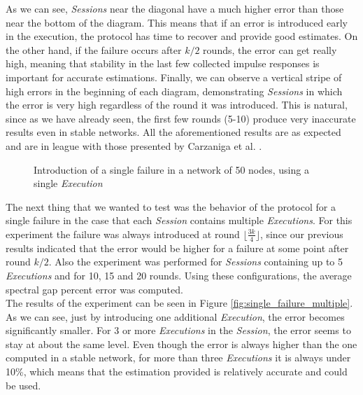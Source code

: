 \documentclass[a4paper,11pt,twoside]{report}
\begin{document}
As we can see, \textit{Sessions} near the diagonal have a much higher error than those near the bottom of the diagram. This means that if an error is introduced early in the execution, the protocol has time to recover and provide good estimates. On the other hand, if the failure occurs after $k/2$ rounds, the error can get really high, meaning that stability in the last few collected impulse responses is important for accurate estimations. Finally, we can observe a vertical stripe of high errors in the beginning of each diagram, demonstrating \textit{Sessions} in which the error is very high regardless of the round it was introduced. This is natural, since as we have already seen, the first few rounds (5-10) produce very inaccurate results even in stable networks. All the aforementioned results are as expected and are in league with those presented by Carzaniga et al. \cite{6195806}. 


\begin{figure} [h]
\centering
{}
\qquad
{}
\caption{Introduction of a single failure in a network of 50 nodes, using a single \textit{Execution}}
\label{fig:single_exec_failure}
\end{figure}

The next thing that we wanted to test was the behavior of the protocol for a single failure in the case that each \textit{Session} contains multiple \textit{Executions}. For this experiment the failure was always introduced at round $\lfloor \frac{3k}{4} \rfloor$, since our previous results indicated that the error would be higher for a failure at some point after round $k/2$. Also the experiment was performed for \textit{Sessions} containing up to 5 \textit{Executions} and for 10, 15 and 20 rounds. Using these configurations, the average spectral gap percent error was computed.\\

The results of the experiment can be seen in Figure \ref{fig:single_failure_multiple}. As we can see, just by introducing one additional \textit{Execution}, the error becomes significantly smaller. For 3 or more \textit{Executions} in the \textit{Session}, the error seems to stay at about the same level. Even though the error is always higher than the one computed in a stable network, for more than three \textit{Executions} it is always under 10\%, which means that the estimation provided is relatively accurate and could be used. 
\end{document}
